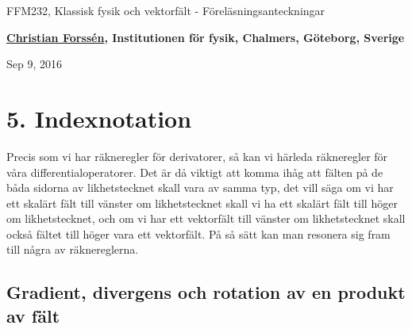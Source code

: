 \documentclass[%
oneside,                 %
final,                   %
10pt]{article}
\begin{document}






\thispagestyle{empty}

\begin{center}
{\LARGE\bf
\begin{spacing}{1.25}
FFM232, Klassisk fysik och vektorfält - Föreläsningsanteckningar
\end{spacing}
}
\end{center}


\begin{center}
{\bf \href{{http://fy.chalmers.se/subatom/tsp/}}{Christian Forssén}, Institutionen för fysik, Chalmers, Göteborg, Sverige${}^{}$} \\ [0mm]
\end{center}

\begin{center}
\end{center}
    

\begin{center}
Sep 9, 2016
\end{center}

\vspace{1cm}


\section{5. Indexnotation}

Precis som vi har räkneregler för derivatorer, så kan vi härleda räkneregler för våra differentialoperatorer. Det är då viktigt att komma ihåg att fälten på de båda sidorna av likhetstecknet skall vara av samma typ, det vill säga om vi har ett skalärt fält till vänster om likhetstecknet skall vi ha ett skalärt fält till höger om likhetstecknet, och om vi har ett vektorfält till vänster om likhetstecknet skall också fältet till höger vara ett vektorfält.  På så sätt kan man resonera sig fram till några av räknereglerna.

\subsection{Gradient, divergens och rotation av en produkt av fält}
\end{document}
